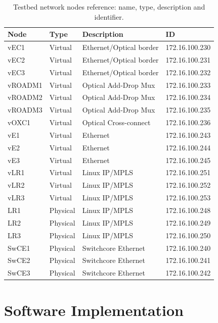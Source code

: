 \documentclass[10pt,a4paper]{report}
\begin{document}
\begin{table}[!htbp]
  \begin{center}
    \begin{tabular}{|l|l|l|l|}
      \hline
      Node & Type & Description & ID \\ \hline
      vEC1 & Virtual & Ethernet/Optical border & 172.16.100.230 \\
      vEC2 & Virtual & Ethernet/Optical border & 172.16.100.231 \\
      vEC3 & Virtual & Ethernet/Optical border & 172.16.100.232 \\
      vROADM1 & Virtual & Optical Add-Drop Mux & 172.16.100.233 \\
      vROADM2 & Virtual & Optical Add-Drop Mux & 172.16.100.234 \\
      vROADM3 & Virtual & Optical Add-Drop Mux & 172.16.100.235 \\
      vOXC1 & Virtual & Optical Cross-connect & 172.16.100.236 \\
      vE1 & Virtual & Ethernet & 172.16.100.243 \\
      vE2 & Virtual & Ethernet & 172.16.100.244 \\
      vE3 & Virtual & Ethernet & 172.16.100.245 \\
      vLR1 & Virtual & Linux IP/MPLS & 172.16.100.251 \\
      vLR2 & Virtual & Linux IP/MPLS & 172.16.100.252 \\
      vLR3 & Virtual & Linux IP/MPLS & 172.16.100.253 \\
      LR1 & Physical & Linux IP/MPLS & 172.16.100.248 \\
      LR2 & Physical & Linux IP/MPLS & 172.16.100.249 \\
      LR3 & Physical & Linux IP/MPLS & 172.16.100.250 \\
      SwCE1 & Physical & Switchcore Ethernet & 172.16.100.240 \\
      SwCE2 & Physical & Switchcore Ethernet & 172.16.100.241 \\
      SwCE3 & Physical & Switchcore Ethernet & 172.16.100.242 \\
      \hline
    \end{tabular}
    \caption[Testbed network nodes]{Testbed network nodes reference:
      name, type, description and identifier.}
    \label{tab:testbed_legend}
  \end{center}
\end{table}

\section{Software Implementation}
\end{document}
